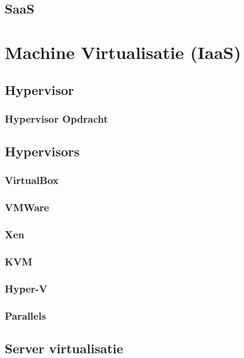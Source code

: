\documentclass[a4paper,12pt,twoside,openright,titlepage]{book}
\begin{document}
\section{SaaS}


\chapter{Machine Virtualisatie (IaaS)}

\section{Hypervisor}

\subsection{Hypervisor Opdracht}

\section{Hypervisors}

\subsection{VirtualBox}

\subsection{VMWare}

\subsection{Xen}

\subsection{KVM}

\subsection{Hyper-V}

\subsection{Parallels}

\section{Server virtualisatie}

\end{document}
